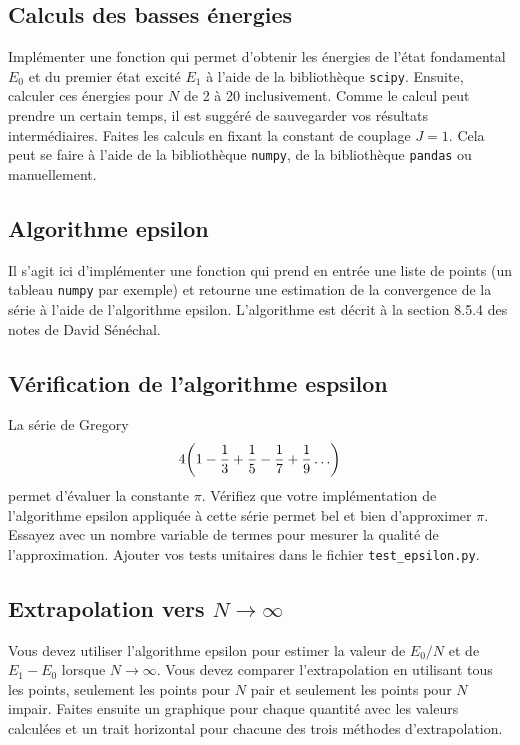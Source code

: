 \documentclass[12pt, letterpaper]{article}
\begin{document}
\subsection{Calculs des basses énergies}\label{subsec:calculs-des-basses-energies}

Implémenter une fonction qui permet d'obtenir les énergies de l'état fondamental
$E_0$ et du premier état excité $E_1$ à l'aide de la bibliothèque \texttt{scipy}.
Ensuite, calculer ces énergies pour $N$ de 2 à 20 inclusivement.
Comme le calcul peut prendre un certain temps, il est suggéré de
sauvegarder vos résultats intermédiaires.
Faites les calculs en fixant la constant de couplage $J = 1$.
Cela peut se faire à l'aide de la bibliothèque \texttt{numpy},
de la bibliothèque \texttt{pandas} ou manuellement.


\subsection{Algorithme epsilon}\label{subsec:algorithme-epsilon}

Il s'agit ici d'implémenter une fonction qui prend en entrée
une liste de points (un tableau \texttt{numpy} par exemple) et
retourne une estimation de la convergence de la série à l'aide
de l'algorithme epsilon.
L'algorithme est décrit à la section 8.5.4 des notes de David Sénéchal.


\subsection{Vérification de l'algorithme espsilon}\label{subsec:verification-de-l'algorithme-espsilon}

La série de Gregory
\begin{equation}
  4\qty(1 - \frac{1}{3} + \frac{1}{5} - \frac{1}{7} + \frac{1}{9} \ldots)
\end{equation}
permet d'évaluer la constante $\pi$.
Vérifiez que votre implémentation de l'algorithme epsilon appliquée à
cette série permet bel et bien d'approximer $\pi$.
Essayez avec un nombre variable de termes pour mesurer la qualité de l'approximation.
Ajouter vos tests unitaires dans le fichier \texttt{test\_epsilon.py}.


\subsection{Extrapolation vers $N \to \infty$}\label{subsec:extrapolation-vers-n-to-infty}

Vous devez utiliser l'algorithme epsilon
pour estimer la valeur de $E_0 / N$ et de $E_1 - E_0$ lorsque $N \to \infty$.
Vous devez comparer l'extrapolation en utilisant tous les points,
seulement les points pour $N$ pair et seulement les points pour $N$ impair.
Faites ensuite un graphique pour chaque quantité avec les valeurs calculées
et un trait horizontal pour chacune des trois méthodes d'extrapolation.
\end{document}
